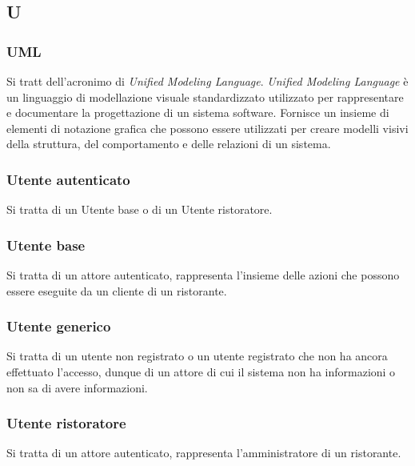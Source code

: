 \subsection{U}

\subsubsection{UML}
Si tratt dell'acronimo di \textit{Unified Modeling Language}.
\textit{Unified Modeling Language} è un linguaggio di modellazione visuale
standardizzato utilizzato per rappresentare e documentare la progettazione di un
sistema software.
Fornisce un insieme di elementi di notazione grafica che possono essere
utilizzati per creare modelli visivi della struttura, del comportamento e delle
relazioni di un sistema.

\subsubsection{Utente autenticato}
Si tratta di un Utente base o di un Utente ristoratore.

\subsubsection{Utente base}
\label{utenteBase}
Si tratta di un attore autenticato, rappresenta l'insieme delle azioni che
possono essere eseguite da un cliente di un ristorante.

\subsubsection{Utente generico}
Si tratta di un utente non registrato o un utente registrato che non ha ancora
effettuato l’accesso, dunque di un attore di cui il sistema non ha informazioni
o non sa di avere informazioni.

\subsubsection{Utente ristoratore}
Si tratta di un attore autenticato, rappresenta l'amministratore di un
ristorante.

\newpage
